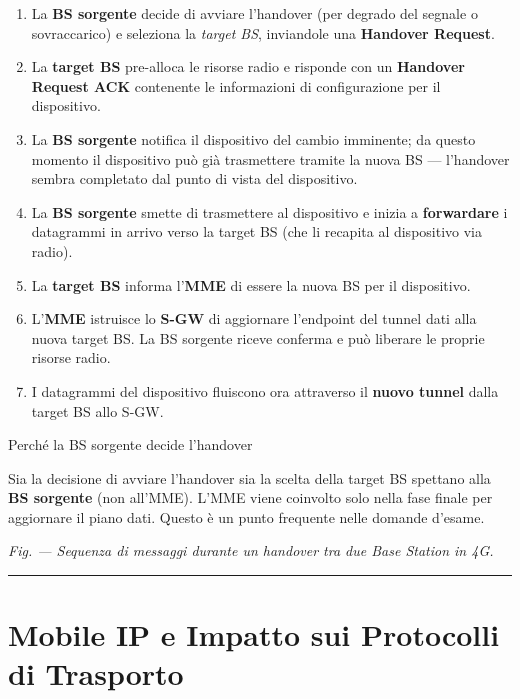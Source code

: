 \documentclass[
  italian,
  openany]{book}
\providecommand{\tightlist}{%
  \setlength{\itemsep}{0pt}\setlength{\parskip}{0pt}}
\begin{document}
\begin{itemize}
  \begin{enumerate}
  \def\labelenumi{\arabic{enumi}.}
  \tightlist
  \item
    La \textbf{BS sorgente} decide di avviare l'handover (per degrado
    del segnale o sovraccarico) e seleziona la \emph{target BS},
    inviandole una \textbf{Handover Request}.
  \item
    La \textbf{target BS} pre-alloca le risorse radio e risponde con un
    \textbf{Handover Request ACK} contenente le informazioni di
    configurazione per il dispositivo.
  \item
    La \textbf{BS sorgente} notifica il dispositivo del cambio
    imminente; da questo momento il dispositivo può già trasmettere
    tramite la nuova BS --- l'handover sembra completato dal punto di
    vista del dispositivo.
  \item
    La \textbf{BS sorgente} smette di trasmettere al dispositivo e
    inizia a \textbf{forwardare} i datagrammi in arrivo verso la target
    BS (che li recapita al dispositivo via radio).
  \item
    La \textbf{target BS} informa l'\textbf{MME} di essere la nuova BS
    per il dispositivo.
  \item
    L'\textbf{MME} istruisce lo \textbf{S-GW} di aggiornare l'endpoint
    del tunnel dati alla nuova target BS. La BS sorgente riceve conferma
    e può liberare le proprie risorse radio.
  \item
    I datagrammi del dispositivo fluiscono ora attraverso il
    \textbf{nuovo tunnel} dalla target BS allo S-GW.
  \end{enumerate}
\end{itemize}

\begin{callouttip}{Perché la BS sorgente decide l’handover}

Sia la decisione di avviare l'handover sia la scelta della target BS
spettano alla \textbf{BS sorgente} (non all'MME). L'MME viene coinvolto
solo nella fase finale per aggiornare il piano dati. Questo è un punto
frequente nelle domande d'esame.

\end{callouttip}

\emph{Fig. --- Sequenza di messaggi durante un handover tra due Base
Station in 4G.}

\begin{center}\rule{0.5\linewidth}{0.5pt}\end{center}

\section{Mobile IP e Impatto sui Protocolli di
Trasporto}\label{mobile-ip-e-impatto-sui-protocolli-di-trasporto}
\end{document}
